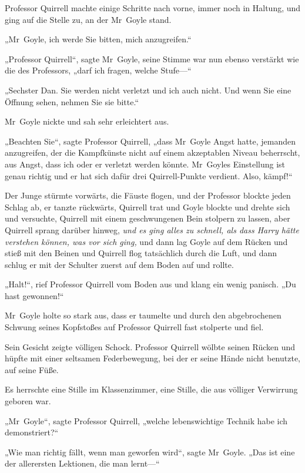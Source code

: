 {Professor Quirrell machte einige Schritte nach vorne, immer noch in Haltung, und ging auf die Stelle zu, an der Mr~Goyle stand.

„Mr~Goyle, ich werde Sie bitten, mich anzugreifen.“

„Professor Quirrell“, sagte Mr~Goyle, seine Stimme war nun ebenso verstärkt wie die des Professors, „darf ich fragen, welche Stufe—“

„Sechster Dan. Sie werden nicht verletzt und ich auch nicht. Und wenn Sie eine Öffnung sehen, nehmen Sie sie bitte.“

Mr~Goyle nickte und sah sehr erleichtert aus.

„Beachten Sie“, sagte Professor Quirrell, „dass Mr~Goyle Angst hatte, jemanden anzugreifen, der die Kampfkünste nicht auf einem akzeptablen Niveau beherrscht, aus Angst, dass ich oder er verletzt werden könnte. Mr~Goyles Einstellung ist genau richtig und er hat sich dafür drei Quirrell-Punkte verdient. Also, kämpf!“

Der Junge stürmte vorwärts, die Fäuste flogen, und der Professor blockte jeden Schlag ab, er tanzte rückwärts, Quirrell trat und Goyle blockte und drehte sich und versuchte, Quirrell mit einem geschwungenen Bein stolpern zu lassen, aber Quirrell sprang darüber hinweg, \emph{und es ging alles zu schnell, als dass Harry hätte verstehen können, was vor sich ging,} und dann lag Goyle auf dem Rücken und stieß mit den Beinen und Quirrell flog tatsächlich durch die Luft, und dann schlug er mit der Schulter zuerst auf dem Boden auf und rollte.

„Halt!“, rief Professor Quirrell vom Boden aus und klang ein wenig panisch. „Du hast gewonnen!“

Mr~Goyle holte so stark aus, dass er taumelte und durch den abgebrochenen Schwung seines Kopfstoßes auf Professor Quirrell fast stolperte und fiel.

Sein Gesicht zeigte völligen Schock. Professor Quirrell wölbte seinen Rücken und hüpfte mit einer seltsamen Federbewegung, bei der er seine Hände nicht benutzte, auf seine Füße.

Es herrschte eine Stille im Klassenzimmer, eine Stille, die aus völliger Verwirrung geboren war.

„Mr~Goyle“, sagte Professor Quirrell, „welche lebenswichtige Technik habe ich demonstriert?“

„Wie man richtig fällt, wenn man geworfen wird“, sagte Mr~Goyle. „Das ist eine der allerersten Lektionen, die man lernt—“

}

